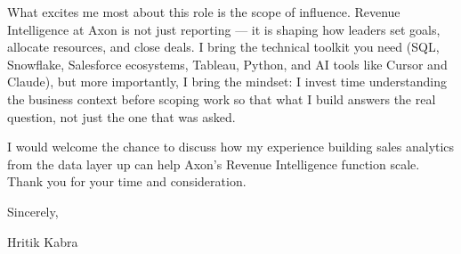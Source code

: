 \documentclass[letterpaper,11pt]{article}
\begin{document}
What excites me most about this role is the scope of influence. Revenue Intelligence at Axon is not just reporting --- it is shaping how leaders set goals, allocate resources, and close deals. I bring the technical toolkit you need (SQL, Snowflake, Salesforce ecosystems, Tableau, Python, and AI tools like Cursor and Claude), but more importantly, I bring the mindset: I invest time understanding the business context before scoping work so that what I build answers the real question, not just the one that was asked.

I would welcome the chance to discuss how my experience building sales analytics from the data layer up can help Axon's Revenue Intelligence function scale. Thank you for your time and consideration.

Sincerely,

Hritik Kabra
\end{document}
